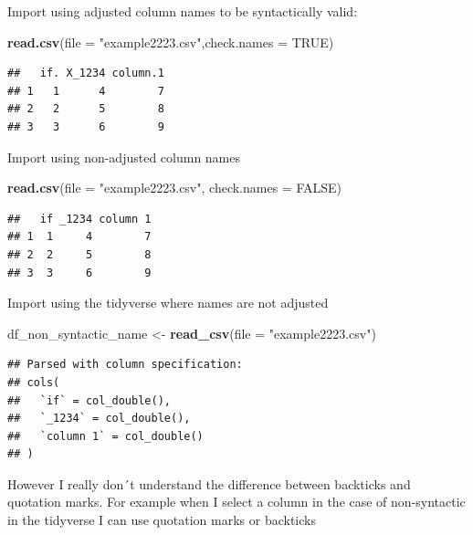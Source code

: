 \documentclass[]{book}
\newenvironment{Shaded}{\begin{snugshade}}{\end{snugshade}}
\newcommand{\DataTypeTok}[1]{\textcolor[rgb]{0.13,0.29,0.53}{#1}}
\newcommand{\KeywordTok}[1]{\textcolor[rgb]{0.13,0.29,0.53}{\textbf{#1}}}
\newcommand{\NormalTok}[1]{#1}
\newcommand{\OperatorTok}[1]{\textcolor[rgb]{0.81,0.36,0.00}{\textbf{#1}}}
\newcommand{\OtherTok}[1]{\textcolor[rgb]{0.56,0.35,0.01}{#1}}
\newcommand{\StringTok}[1]{\textcolor[rgb]{0.31,0.60,0.02}{#1}}
\begin{document}
Import using adjusted column names to be syntactically valid:

\begin{Shaded}
\begin{Highlighting}[]
\KeywordTok{read.csv}\NormalTok{(}\DataTypeTok{file =} \StringTok{"example2223.csv"}\NormalTok{,}\DataTypeTok{check.names =} \OtherTok{TRUE}\NormalTok{)}
\end{Highlighting}
\end{Shaded}

\begin{verbatim}
##   if. X_1234 column.1
## 1   1      4        7
## 2   2      5        8
## 3   3      6        9
\end{verbatim}

Import using non-adjusted column names

\begin{Shaded}
\begin{Highlighting}[]
\KeywordTok{read.csv}\NormalTok{(}\DataTypeTok{file =} \StringTok{"example2223.csv"}\NormalTok{, }\DataTypeTok{check.names =} \OtherTok{FALSE}\NormalTok{)}
\end{Highlighting}
\end{Shaded}

\begin{verbatim}
##   if _1234 column 1
## 1  1     4        7
## 2  2     5        8
## 3  3     6        9
\end{verbatim}

Import using the tidyverse where names are not adjusted

\begin{Shaded}
\begin{Highlighting}[]
\NormalTok{df_non_syntactic_name  <-}\StringTok{ }\KeywordTok{read_csv}\NormalTok{(}\DataTypeTok{file =} \StringTok{"example2223.csv"}\NormalTok{)}
\end{Highlighting}
\end{Shaded}

\begin{verbatim}
## Parsed with column specification:
## cols(
##   `if` = col_double(),
##   `_1234` = col_double(),
##   `column 1` = col_double()
## )
\end{verbatim}

However I really don´t understand the difference between backticks and quotation marks. For example when I select a column in the case of non-syntactic in the tidyverse I can use quotation marks or backticks

\begin{Shaded}
\end{Shaded}
\end{document}
